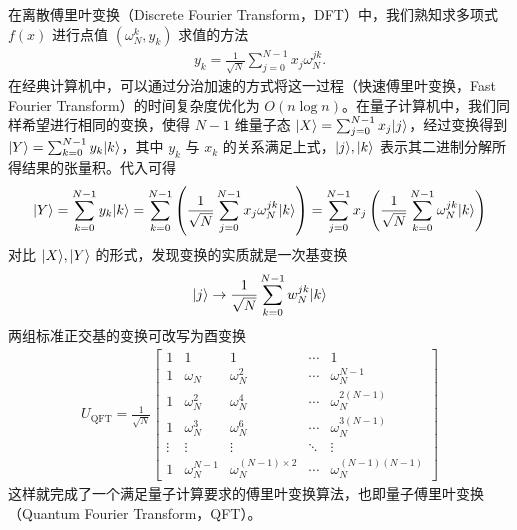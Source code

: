 在离散傅里叶变换（Discrete Fourier Transform，DFT）中，我们熟知求多项式 $f(x)$ 进行点值 $(\omega_N^k,y_k)$ 求值的方法 \begin{align*}
    y_k=\frac{1}{\sqrt{N}}\sum_{j=0}^{N-1}x_j\omega_N^{jk}.
\end{align*}
在经典计算机中，可以通过分治加速的方式将这一过程（快速傅里叶变换，Fast Fourier Transform）的时间复杂度优化为 $O(n\log n)$\cite{cooley1965algorithm}。在量子计算机中，我们同样希望进行相同的变换，使得 $N-1$ 维量子态 $|X\rangle=\sum_{j=0}^{N-1}x_j|j\rangle$，经过变换得到 $|Y\rangle=\sum_{k=0}^{N-1}y_k|k\rangle$，其中 $y_k$ 与 $x_k$ 的关系满足上式，$|j\rangle,|k\rangle$ 表示其二进制分解所得结果的张量积。代入可得 \begin{align*}
    |Y\rangle=\sum_{k=0}^{N-1}y_k|k\rangle=\sum_{k=0}^{N-1}\left(\frac{1}{\sqrt{N}}\sum_{j=0}^{N-1}x_j\omega_N^{jk}|k\rangle\right)=\sum_{j=0}^{N-1}x_j\left(\frac{1}{\sqrt{N}}\sum_{k=0}^{N-1}\omega_N^{jk}|k\rangle\right)
\end{align*}
对比 $|X\rangle,|Y\rangle$ 的形式，发现变换的实质就是一次基变换 \begin{align}\begin{aligned}
        |j\rangle\to\frac{1}{\sqrt{N}}\sum_{k=0}^{N-1}w_N^{jk}|k\rangle\label{eq:qft-change-basis}
    \end{aligned}\end{align}
两组标准正交基的变换可改写为酉变换 \begin{align*}
    U_{\text{QFT}} = \frac{1}{\sqrt{N}}
    \begin{bmatrix}
        1      & 1               & 1                         & \cdots & 1                      \\
        1      & \omega_N        & \omega_N ^{2}             & \cdots & \omega_N ^{N-1}        \\
        1      & \omega_N ^{2}   & \omega_N ^{4}             & \cdots & \omega_N ^{2(N-1)}     \\
        1      & \omega_N ^{3}   & \omega_N ^{6}             & \cdots & \omega_N ^{3(N-1)}     \\
        \vdots & \vdots          & \vdots                    & \ddots & \vdots                 \\
        1      & \omega_N ^{N-1} & \omega_N ^{(N-1)\times 2} & \cdots & \omega_N ^{(N-1)(N-1)}
    \end{bmatrix}
\end{align*}
这样就完成了一个满足量子计算要求的傅里叶变换算法，也即量子傅里叶变换（Quantum Fourier Transform，QFT）。

